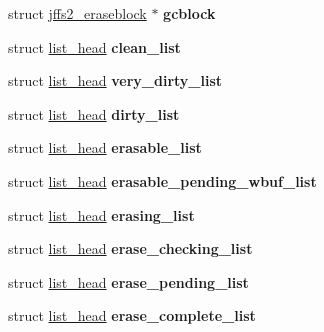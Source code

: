 \begin{DoxyCompactItemize}
struct \mbox{\hyperlink{structjffs2__eraseblock}{jffs2\+\_\+eraseblock}} $\ast$ {\bfseries gcblock}
\item 
\mbox{\label{structjffs2__sb__info_a155e5532b0a80717ad7f917f2994629f}} 
struct \mbox{\hyperlink{structlist__head}{list\+\_\+head}} {\bfseries clean\+\_\+list}
\item 
\mbox{\label{structjffs2__sb__info_acf1cc7483006f246c4dae257b7330c3c}} 
struct \mbox{\hyperlink{structlist__head}{list\+\_\+head}} {\bfseries very\+\_\+dirty\+\_\+list}
\item 
\mbox{\label{structjffs2__sb__info_abf63922f89f6e69221fa8a0d3f32ec9f}} 
struct \mbox{\hyperlink{structlist__head}{list\+\_\+head}} {\bfseries dirty\+\_\+list}
\item 
\mbox{\label{structjffs2__sb__info_af0b11cc0e4437b7b164ef832437de2b4}} 
struct \mbox{\hyperlink{structlist__head}{list\+\_\+head}} {\bfseries erasable\+\_\+list}
\item 
\mbox{\label{structjffs2__sb__info_af3ef01b8e8219187e2c674074201eb3e}} 
struct \mbox{\hyperlink{structlist__head}{list\+\_\+head}} {\bfseries erasable\+\_\+pending\+\_\+wbuf\+\_\+list}
\item 
\mbox{\label{structjffs2__sb__info_a8d6a3de650ba0b2af923ac7deaffb1e1}} 
struct \mbox{\hyperlink{structlist__head}{list\+\_\+head}} {\bfseries erasing\+\_\+list}
\item 
\mbox{\label{structjffs2__sb__info_a8a754559c63ee7d709afddab724bbc66}} 
struct \mbox{\hyperlink{structlist__head}{list\+\_\+head}} {\bfseries erase\+\_\+checking\+\_\+list}
\item 
\mbox{\label{structjffs2__sb__info_a443ef591c84c36f3f3b5876c0a979908}} 
struct \mbox{\hyperlink{structlist__head}{list\+\_\+head}} {\bfseries erase\+\_\+pending\+\_\+list}
\item 
\mbox{\label{structjffs2__sb__info_aa591382fa657263222fb6046de3e140e}} 
struct \mbox{\hyperlink{structlist__head}{list\+\_\+head}} {\bfseries erase\+\_\+complete\+\_\+list}

\end{DoxyCompactItemize}
